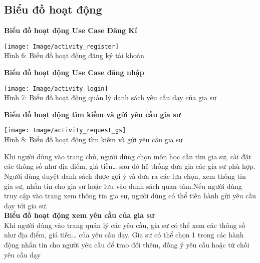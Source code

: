 \documentclass[12pt,a4paper]{report}
\begin{document}
\subsection{Biểu đồ hoạt động}

\textbf{Biểu đồ hoạt động Use Case Đăng Kí}\\

\begin{center}
    \begin{center}
     \texttt{[image: Image/activity\_register]}\\
     Hình 6: Biểu đồ hoạt động đăng ký tài khoản
    \end{center}
\end{center}

\newpage
\textbf{Biểu đồ hoạt động Use Case đăng nhập}\\
\begin{center}
    \begin{center}
     \texttt{[image: Image/activity\_login]}\\
     Hình 7: Biểu đồ hoạt động quản lý danh sách yêu cầu dạy của gia sư
    \end{center}
\end{center}

\newpage
\textbf{Biểu đồ hoạt động tìm kiếm và gửi yêu cầu gia sư}

\begin{center}
    \begin{center}
     \texttt{[image: Image/activity\_request\_gs]}\\
     Hình 8: Biểu đồ hoạt động tìm kiếm và gửi yêu cầu gia sư
    \end{center}
\end{center}

Khi người dùng vào trang chủ, người dùng chọn môn học cần tìm gia sư, cài đặt các thông số như địa điểm, giá tiền… sau đó hệ thống đưa gia các gia sư phù hợp. Người dùng duyệt danh sách được gợi ý và đưa ra các lựa chọn, xem thông tin gia sư, nhắn tin cho gia sư hoặc lưu vào danh sách quan tâm.Nếu người dùng truy cập vào trang xem thông tin gia sư, người dùng có thể tiến hành gửi yêu cầu dạy tới gia sư.\\

 \textbf{Biểu đồ hoạt động xem yêu cầu của gia sư}\\
 
Khi người dùng vào trang quản lý các yêu cầu, gia sư có thể xem các thông số như địa điểm, giá tiền… của yêu cầu dạy. Gia sư có thể chọn 1 trong các hành động nhắn tin cho người yêu cầu để trao đổi thêm, đồng ý yêu cầu hoặc từ chối yêu cầu dạy\\
\end{document}
